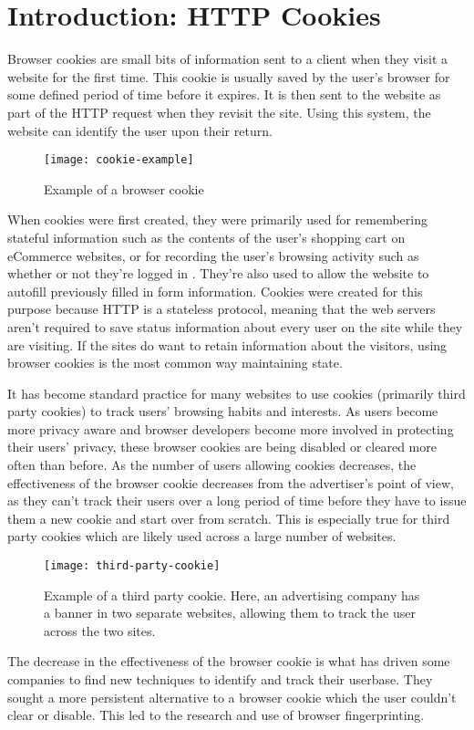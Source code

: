 \chapter{Introduction: HTTP Cookies}

Browser cookies are small bits of information sent to a client when they visit a website for the first time.
This cookie is usually saved by the user's browser for some defined period of time before it expires.
It is then sent to the website as part of the HTTP request when they revisit the site.
Using this system, the website can identify the user upon their return.

\begin{figure}[h]
\caption{Example of a browser cookie}
\texttt{[image: cookie-example]}
\centering
\end{figure}

When cookies were first created, they were primarily used for remembering stateful information such as the contents of the user's shopping cart on eCommerce websites, or for recording the user's browsing activity such as whether or not they're logged in \citep{cookiesbackground}.
They're also used to allow the website to autofill previously filled in form information.
Cookies were created for this purpose because HTTP is a stateless protocol, meaning that the web servers aren't required to save status information about every user on the site while they are visiting.
If the sites do want to retain information about the visitors, using browser cookies is the most common way maintaining state.

It has become standard practice for many websites to use cookies (primarily third party cookies) to track users' browsing habits and interests.
As users become more privacy aware and browser developers become more involved in protecting their users' privacy, these browser cookies are being disabled or cleared more often than before.
As the number of users allowing cookies decreases, the effectiveness of the browser cookie decreases from the advertiser's point of view, as they can't track their users over a long period of time before they have to issue them a new cookie and start over from scratch.
This is especially true for third party cookies which are likely used across a large number of websites.

\begin{figure}[h]
\caption{Example of a third party cookie.
Here, an advertising company has a banner in two separate websites, allowing them to track the user across the two sites.}
\texttt{[image: third-party-cookie]}
\centering
\end{figure}

The decrease in the effectiveness of the browser cookie is what has driven some companies to find new techniques to identify and track their userbase.
They sought a more persistent alternative to a browser cookie which the user couldn't clear or disable.
This led to the research and use of browser fingerprinting.

